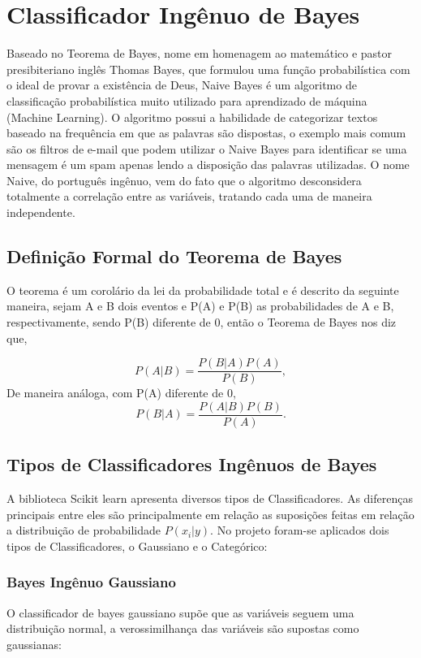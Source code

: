 \documentclass[conference]{IEEEtran}
\begin{document}
\section{Classificador Ingênuo de Bayes}
Baseado no Teorema de Bayes, nome em homenagem ao matemático e pastor presibiteriano inglês Thomas Bayes, que formulou uma função probabilística com o ideal de provar a existência de Deus, Naive Bayes é um algoritmo de classificação probabilística muito utilizado para aprendizado de máquina (Machine Learning). O algoritmo possui a habilidade de categorizar textos baseado na frequência em que as palavras são dispostas, o exemplo mais comum são os filtros de e-mail que podem utilizar o Naive Bayes para identificar se uma mensagem é um spam apenas lendo a disposição das palavras utilizadas. O nome Naive, do português ingênuo, vem do fato que o algoritmo desconsidera totalmente a correlação entre as variáveis, tratando cada uma de maneira independente.

\subsection{Definição Formal do Teorema de Bayes}
O teorema é um corolário da lei da probabilidade total e é descrito da seguinte maneira, sejam A e B dois eventos e P(A) e P(B) as probabilidades de A e B, respectivamente, sendo P(B) diferente de 0, então o Teorema de Bayes nos diz que,

\begin{equation}
    P(A|B) = \frac{P(B|A)P(A)}{P(B)},
\end{equation} 
De maneira análoga, com P(A) diferente de 0,  
\begin{equation}
   P(B|A) = \frac{P(A|B)P(B)}{P(A)}.
\end{equation} 
\cite{b9}
\subsection{Tipos de Classificadores Ingênuos de Bayes}
A biblioteca Scikit learn apresenta diversos tipos de Classificadores. As diferenças principais entre eles são principalmente em relação as suposições feitas em relação a distribuição de probabilidade $P(x_i|y)$. 
No projeto foram-se aplicados dois tipos de Classificadores, o Gaussiano e o Categórico:

\subsubsection{Bayes Ingênuo Gaussiano}
O classificador de bayes gaussiano supõe que as variáveis seguem uma distribuição normal, a verossimilhança das variáveis são supostas como gaussianas:
\end{document}
